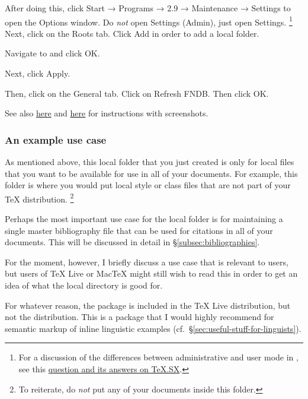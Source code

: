 After doing this, click Start → Programs →  2.9 → Maintenance → Settings to open the  Options window.
Do \emph{not} open Settings (Admin), just open Settings.%
\footnote{%
For a discussion of the differences between administrative and user mode in , see this \href{http://tex.stackexchange.com/q/67712/32888}{question and its answers on TeX.SX}.%
}
Next, click on the Roots tab.
Click Add in order to add a local  folder.

Navigate to  and click OK.

Next, click Apply.

Then, click on the General tab.
Click on Refresh FNDB.
Then click OK.

See also \href{http://docs.miktex.org/manual/localadditions.html#id584820}{here} and \href{http://docs.miktex.org/manual/configuring.html#fndbupdate}{here} for instructions with screenshots.

\subsubsection{An example use case}
\label{subsubsec:an-example-use-case}

As mentioned above, this local  folder that you just created is only for local files that you want to be available for use in all of your  documents.
For example, this  folder is where you would put local style or class files that are not part of your \TeX{} distribution.%
\footnote{%
To reiterate, do \emph{not} put any of your  documents inside this  folder.%
}

Perhaps the most important use case for the local  folder is for maintaining a single master bibliography file that can be used for citations in all of your documents.
This will be discussed in detail in \S\ref{subsec:bibliographies}.

For the moment, however, I briefly discuss a use case that is relevant to  users, but users of TeX Live or {Mac\TeX} might still wish to read this in order to get an idea of what the local  directory is good for.

For whatever reason, the package  is included in the TeX Live distribution, but not the  distribution.
This is a package that I would highly recommend for semantic markup of inline linguistic examples (cf.~\S\ref{sec:useful-stuff-for-linguists}).

